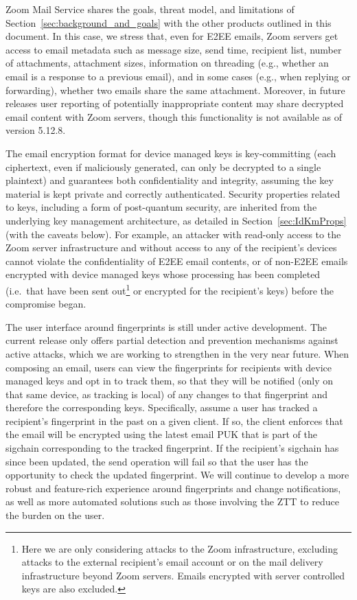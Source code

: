 Zoom Mail Service shares the goals, threat model, and limitations of
Section~\ref{sec:background_and_goals} with the other products outlined in this document. In this
case, we stress that, even for E2EE emails, Zoom servers get access to email metadata such as
message size, send time, recipient list, number of attachments, attachment sizes, information on
threading (e.g., whether an email is a response to a previous email), and in some cases (e.g., when
replying or forwarding), whether two emails share the same attachment. Moreover, in future releases
user reporting of potentially inappropriate content may share decrypted email content with Zoom
servers, though this functionality is not available as of version 5.12.8.

The email encryption format for device managed keys is key-committing (each ciphertext, even if
maliciously generated, can only be decrypted to a single plaintext) and guarantees both
confidentiality and integrity, assuming the key material is kept private and correctly
authenticated. Security properties related to keys, including a form of post-quantum security, are
inherited from the underlying key management architecture, as detailed in
Section~\ref{sec:IdKmProps} (with the caveats below). For example, an attacker with read-only access
to the Zoom server infrastructure and without access to any of the recipient's devices cannot
violate the confidentiality of E2EE email contents, or of non-E2EE emails encrypted with device
managed keys whose processing has been completed (i.e.\ that have been sent out\footnote{Here we are
only considering attacks to the Zoom infrastructure, excluding attacks to the external recipient's
email account or on the mail delivery infrastructure beyond Zoom servers. Emails encrypted with
server controlled keys are also excluded.} or encrypted for the recipient's keys) before the
compromise began.

The user interface around fingerprints is still under active development. The current release only
offers partial detection and prevention mechanisms against active attacks, which we are working to
strengthen in the very near future. When composing an email, users can view the fingerprints for
recipients with device managed keys and opt in to track them, so that they will be notified (only on
that same device, as tracking is local) of any changes to that fingerprint and therefore the
corresponding keys. Specifically, assume a user has tracked a recipient's fingerprint in the past on
a given client. If so, the client enforces that the email will be encrypted using the latest email
PUK that is part of the sigchain corresponding to the tracked fingerprint. If the recipient's
sigchain has since been updated, the send operation will fail so that the user has the opportunity
to check the updated fingerprint. We will continue to develop a more robust and feature-rich
experience around fingerprints and change notifications, as well as more automated solutions such as
those involving the ZTT to reduce the burden on the user.

